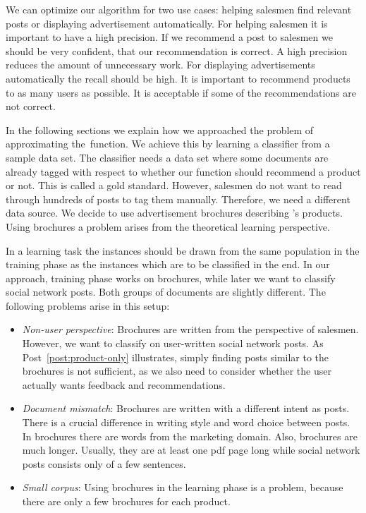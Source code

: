 We can optimize our algorithm for two use cases: helping salesmen find relevant posts or displaying advertisement automatically.
For helping salesmen it is important to have a high precision. 
If we recommend a post to salesmen we should be very confident, that our recommendation is correct. 
A high precision reduces the amount of unnecessary work.
For displaying advertisements automatically the recall should be high. 
It is important to recommend products to as many users as possible.
It is acceptable if some of the recommendations are not correct.   

In the following sections we explain how we approached the problem of approximating the~\nto function.
We achieve this by learning a classifier from a sample data set. 
The classifier needs a data set where some documents are already tagged with respect to whether our \nto function should recommend a product or not.
This is called a gold standard.
However, salesmen do not want to read through hundreds of posts to tag them manually.
Therefore, we need a different data source.
We decide to use advertisement brochures describing \acme's products. 
Using brochures a problem arises from the theoretical learning perspective.

In a learning task the instances should be drawn from the same population in the training phase as the instances which are to be classified in the end.\nr
In our approach, training phase works on brochures, while later we want to classify social network posts. 
Both groups of documents are slightly different.
The following problems arise in this setup:

 \begin{itemize}
 	\item
		\emph{Non-user perspective}:
		Brochures are written from the perspective of salesmen.
		However, we want to classify on user-written social network posts.
		As Post~\ref{post:product-only} illustrates, simply finding posts similar to the brochures is not sufficient, as we also need to consider whether the user actually wants feedback and recommendations.
	\item
		\emph{Document mismatch}:
		Brochures are written with a different intent as posts.
		There is a crucial difference in writing style and word choice between posts.
		In brochures there are words from the marketing domain. 
		Also, brochures are much longer. 
		Usually, they are at least one pdf page long while social network posts consists only of a few sentences. 
	\item
		\emph{Small corpus}:
		Using brochures in the learning phase is a problem, because there are only a few brochures for each product.
 \end{itemize}


